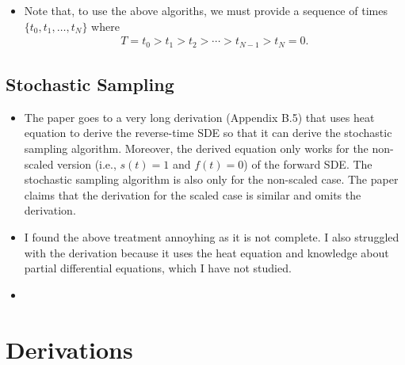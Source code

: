 \documentclass[10pt]{article}
\begin{document}
\begin{itemize}
  \item Note that, to use the above algoriths, we must provide a sequence of times $\{ t_0, t_1, \dotsc, t_N \}$ where
  \begin{align*}
    T = t_0 > t_1 > t_2 > \dotsb > t_{N-1} > t_N = 0.
  \end{align*}
\end{itemize}

\subsection{Stochastic Sampling}

\begin{itemize}
  \item The paper goes to a very long derivation (Appendix B.5) that uses heat equation to derive the reverse-time SDE \cite{Anderson:1982} so that it can derive the stochastic sampling algorithm. Moreover, the derived equation only works for the non-scaled version (i.e., $s(t) = 1$ and $f(t) = 0$) of the forward SDE. The stochastic sampling algorithm is also only for the non-scaled case. The paper claims that the derivation for the scaled case is similar and omits the derivation.
  
  \item I found the above treatment annoyhing as it is not complete. I also struggled with the derivation because it uses the heat equation and knowledge about partial differential equations, which I have not studied.
  
  \item 
\end{itemize}

\appendix

\section{Derivations}
\end{document}
